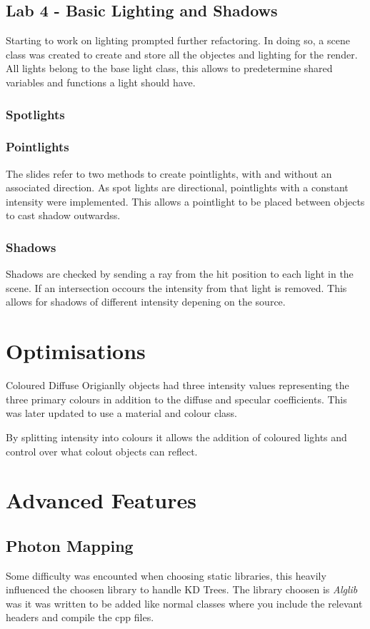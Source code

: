 \documentclass{article}
\begin{document}
\subsection{Lab 4 - Basic Lighting and Shadows}
Starting to work on lighting prompted further refactoring. In doing so, a scene class was created to create and store all the objectes and lighting for the render. All lights belong to the base light class, this allows to predetermine shared variables and functions a light should have.
\subsubsection{Spotlights}


\subsubsection{Pointlights}
The slides refer to two methods to create pointlights, with and without an associated direction. As spot lights are directional, pointlights with a constant intensity were implemented. This allows a pointlight to be placed between objects to cast shadow outwardss.
\subsubsection{Shadows}
Shadows are checked by sending a ray from the hit position to each light in the scene. If an intersection occours the intensity from that light is removed. This allows for shadows of different intensity depening on the source.

\section{Optimisations}
Coloured Diffuse
Origianlly objects had three intensity values representing the three primary colours in addition to the diffuse and specular coefficients. This was later updated to use a material and colour class.

By splitting intensity into colours it allows the addition of coloured lights and control over what colout objects can reflect.

\section{Advanced Features}
\subsection{Photon Mapping}
Some difficulty was encounted when choosing static libraries, this heavily influenced the choosen library to handle KD Trees. The library choosen is \textit{Alglib} was it was written to be added like normal classes where you include the relevant headers and compile the cpp files. 
\end{document}
